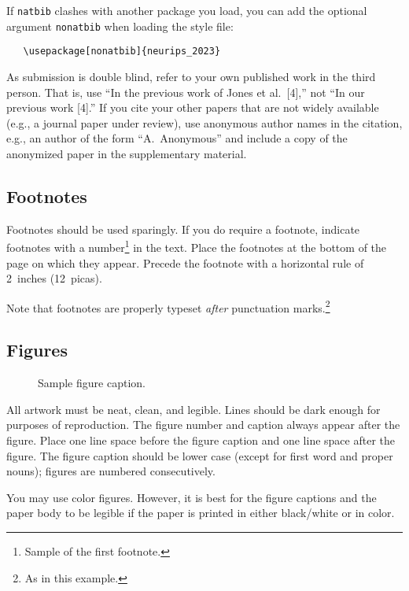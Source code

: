 \documentclass{article}
\begin{document}
If \verb+natbib+ clashes with another package you load, you can add the optional
argument \verb+nonatbib+ when loading the style file:
\begin{verbatim}
   \usepackage[nonatbib]{neurips_2023}
\end{verbatim}


As submission is double blind, refer to your own published work in the third
person. That is, use ``In the previous work of Jones et al.\ [4],'' not ``In our
previous work [4].'' If you cite your other papers that are not widely available
(e.g., a journal paper under review), use anonymous author names in the
citation, e.g., an author of the form ``A.\ Anonymous'' and include a copy of the anonymized paper in the supplementary material.


\subsection{Footnotes}


Footnotes should be used sparingly.  If you do require a footnote, indicate
footnotes with a number\footnote{Sample of the first footnote.} in the
text. Place the footnotes at the bottom of the page on which they appear.
Precede the footnote with a horizontal rule of 2~inches (12~picas).


Note that footnotes are properly typeset \emph{after} punctuation
marks.\footnote{As in this example.}


\subsection{Figures}


\begin{figure}
  \centering
  \fbox{\rule[-.5cm]{0cm}{4cm} \rule[-.5cm]{4cm}{0cm}}
  \caption{Sample figure caption.}
\end{figure}


All artwork must be neat, clean, and legible. Lines should be dark enough for
purposes of reproduction. The figure number and caption always appear after the
figure. Place one line space before the figure caption and one line space after
the figure. The figure caption should be lower case (except for first word and
proper nouns); figures are numbered consecutively.


You may use color figures.  However, it is best for the figure captions and the
paper body to be legible if the paper is printed in either black/white or in
color.
\end{document}
